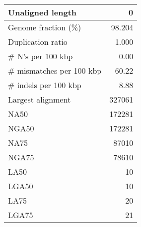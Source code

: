 \documentclass[12pt,a4paper]{article}
\begin{document}
\begin{table}[ht]
\begin{center}
\begin{tabular}{|l*{1}{|r}|}
Unaligned length & 0 \\ \hline
Genome fraction (\%) & 98.204 \\ \hline
Duplication ratio & 1.000 \\ \hline
\# N's per 100 kbp & 0.00 \\ \hline
\# mismatches per 100 kbp & 60.22 \\ \hline
\# indels per 100 kbp & 8.88 \\ \hline
Largest alignment & 327061 \\ \hline
NA50 & 172281 \\ \hline
NGA50 & 172281 \\ \hline
NA75 & 87010 \\ \hline
NGA75 & 78610 \\ \hline
LA50 & 10 \\ \hline
LGA50 & 10 \\ \hline
LA75 & 20 \\ \hline
LGA75 & 21 \\ \hline
\end{tabular}
\end{center}
\end{table}
\end{document}
